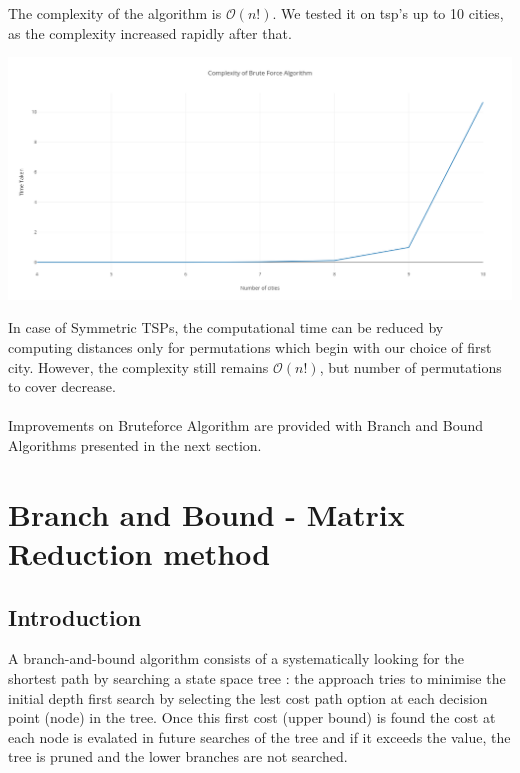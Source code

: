 \documentclass[11pt, english]{article}
\begin{document}
\noindent
The complexity of the algorithm is $\mathcal{O}(n!)$. We tested it on tsp's up to 10 cities, as the complexity increased rapidly after that.

\begin{center}
\includegraphics[scale=0.3]{bruteforce.png}
\end{center}

\noindent
In case of Symmetric TSPs, the computational time can be reduced by computing distances only for permutations which begin with our choice of first city. However, the complexity still remains $\mathcal{O}(n!)$, but number of permutations to cover decrease.\\
\\
\noindent
Improvements on Bruteforce Algorithm are provided with Branch and Bound Algorithms presented in the next section.


\newpage
\section{Branch and Bound - Matrix Reduction method}
\subsection{Introduction}
A branch-and-bound algorithm consists of a systematically looking for the shortest path by searching a state space tree : the approach tries to minimise the initial depth first search by selecting the lest cost path option at each decision point (node) in the tree. Once this first cost (upper bound) is found the cost at each node is evalated in future searches of the tree and if it exceeds the value, the tree is pruned and the lower branches are not searched.
\end{document}
